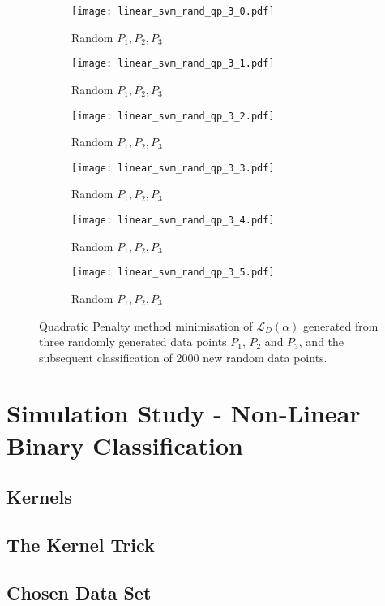 \documentclass[10pt, a4paper,reqno]{amsart}
\begin{document}
\begin{figure}[H]
	\centering	
	\begin{subfigure}{0.5\textwidth}
		\centering
		\texttt{[image: linear\_svm\_rand\_qp\_3\_0.pdf]}
		\caption{Random $P_1, P_2, P_3$}
	\end{subfigure}%
	\begin{subfigure}{0.5\textwidth}
		\centering
		\texttt{[image: linear\_svm\_rand\_qp\_3\_1.pdf]}
		\caption{Random $P_1, P_2, P_3$}
	\end{subfigure}
	\begin{subfigure}{0.5\textwidth}
		\centering
		\texttt{[image: linear\_svm\_rand\_qp\_3\_2.pdf]}
		\caption{Random $P_1, P_2, P_3$}
	\end{subfigure}%
	\begin{subfigure}{0.5\textwidth}
		\centering
		\texttt{[image: linear\_svm\_rand\_qp\_3\_3.pdf]}
		\caption{Random $P_1, P_2, P_3$}
	\end{subfigure}
	\begin{subfigure}{0.5\textwidth}
		\centering
		\texttt{[image: linear\_svm\_rand\_qp\_3\_4.pdf]}
		\caption{Random $P_1, P_2, P_3$}
	\end{subfigure}%
	\begin{subfigure}{0.5\textwidth}
		\centering
		\texttt{[image: linear\_svm\_rand\_qp\_3\_5.pdf]}
		\caption{Random $P_1, P_2, P_3$}
	\end{subfigure}
	\caption{Quadratic Penalty method minimisation of $\mathcal{L}_D(\alpha)$ generated from three randomly generated data points $P_1$, $P_2$ and $P_3$, and the subsequent classification of 2000 new random data points.}
\end{figure}


\clearpage\section{Simulation Study - Non-Linear Binary Classification}


\subsection{Kernels}


\subsection{The Kernel Trick}


\subsection{Chosen Data Set}
\end{document}
